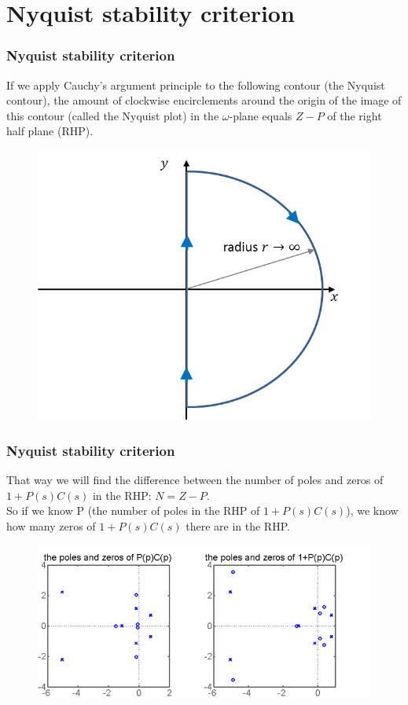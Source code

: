 \section{Nyquist stability criterion}

\begin{frame}
	\frametitle{Nyquist stability criterion}
	If we apply Cauchy's argument principle to the following contour (the Nyquist contour), the amount of clockwise encirclements around the origin of the image of this contour (called the Nyquist plot) in the $\omega$-plane equals $Z-P$ of the right half plane (RHP).
	\vspace{-1ex}
	\begin{figure}
		\includegraphics[width=0.53\linewidth]{nyquist}
	\end{figure}
\end{frame}

\begin{frame}
	\frametitle{Nyquist stability criterion}
	That way we will find the difference between the number of poles and zeros of $1+P(s)C(s)$ in the RHP: $N=Z-P$.\\
	\medskip
	So if we know P (the number of poles in the RHP of $1+P(s)C(s)$), we know how many zeros of $1+P(s)C(s)$ there are in the RHP.
	\begin{figure}
		\includegraphics[width=0.8\linewidth]{pz}
	\end{figure}
\end{frame}

